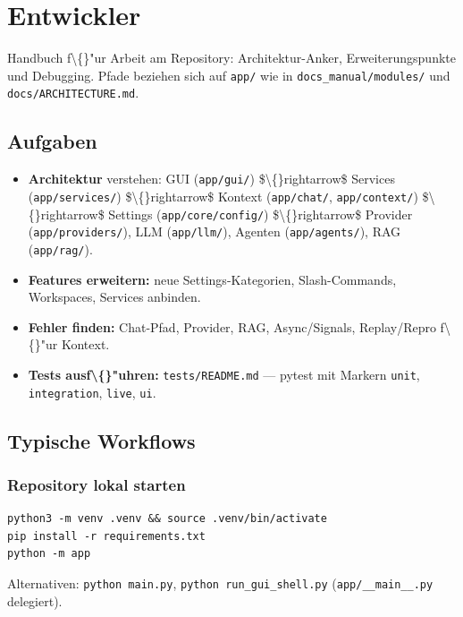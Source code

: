 \section{Entwickler}

Handbuch f\textbackslash\{\}"ur Arbeit am Repository: Architektur-Anker, Erweiterungspunkte und Debugging. Pfade beziehen sich auf \texttt{app/} wie in \texttt{docs\_manual/modules/} und \texttt{docs/ARCHITECTURE.md}.

\subsection{Aufgaben}

\begin{itemize}
\item \textbf{Architektur} verstehen: GUI (\texttt{app/gui/}) \$\textbackslash\{\}rightarrow\$ Services (\texttt{app/services/}) \$\textbackslash\{\}rightarrow\$ Kontext (\texttt{app/chat/}, \texttt{app/context/}) \$\textbackslash\{\}rightarrow\$ Settings (\texttt{app/core/config/}) \$\textbackslash\{\}rightarrow\$ Provider (\texttt{app/providers/}), LLM (\texttt{app/llm/}), Agenten (\texttt{app/agents/}), RAG (\texttt{app/rag/}).
\item \textbf{Features erweitern:} neue Settings-Kategorien, Slash-Commands, Workspaces, Services anbinden.
\item \textbf{Fehler finden:} Chat-Pfad, Provider, RAG, Async/Signals, Replay/Repro f\textbackslash\{\}"ur Kontext.
\item \textbf{Tests ausf\textbackslash\{\}"uhren:} \texttt{tests/README.md} --- pytest mit Markern \texttt{unit}, \texttt{integration}, \texttt{live}, \texttt{ui}.
\end{itemize}

\subsection{Typische Workflows}

\subsubsection{Repository lokal starten}

\begin{verbatim}
python3 -m venv .venv && source .venv/bin/activate
pip install -r requirements.txt
python -m app
\end{verbatim}

Alternativen: \texttt{python main.py}, \texttt{python run\_gui\_shell.py} (\texttt{app/\_\_main\_\_.py} delegiert).

